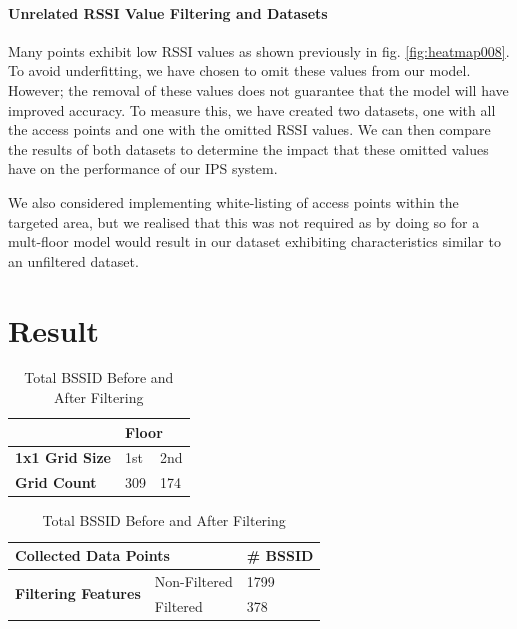 \documentclass[runningheads]{llncs}
\begin{document}
\paragraph{Unrelated RSSI Value Filtering and Datasets} Many points exhibit low RSSI values as shown previously in fig. \ref{fig:heatmap008}. To avoid underfitting, we have chosen to omit these values from our model. However; the removal of these values does not guarantee that the model will have improved accuracy. To measure this, we have created two datasets, one with all the access points and one with the omitted RSSI values. We can then compare the results of both datasets to determine the impact that these omitted values have on the performance of our IPS system.

We also considered implementing white-listing of access points within the targeted area, but we realised that this was not required as by doing so for a mult-floor model would result in our dataset exhibiting characteristics similar to an unfiltered dataset.


\section{Result}
\begin{table}[htbp]
	\centering
	\begin{minipage}{0.38\textwidth}
		\centering
		\caption{Total True Unique Grids by Floor (1x1 Grid Size)
		\label{tab:true_unique_grid}}
		\vspace{-10pt}
		\begin{tabular}{|l|l|l|} 
			\hline
			& \multicolumn{2}{l|}{\textbf{Floor}}  \\ 
			\hline
			\textbf{1x1 Grid Size} & 1st & 2nd                            \\ 
			\hline
			\textbf{Grid Count}    & 309 & 174                            \\
			\hline
		\end{tabular}
	\end{minipage}
	\hspace{10pt}
	\begin{minipage}{0.48\textwidth}
		\centering
		\caption{Total BSSID Before and After Filtering}
		\label{tab:bssid_counts}
		\centering
		\begin{tabular}{|l|l|l|}
			\hline
			\multicolumn{2}{|l|}{\textbf{Collected Data Points}} & \textbf{\# BSSID} \\
			\hline
			\multirow{2}{*}{\textbf{Filtering Features}} & Non-Filtered & 1799 \\
			\cline{2-3}
			& Filtered & 378 \\
			\hline
		\end{tabular}
	\end{minipage}
\end{table}
\end{document}

